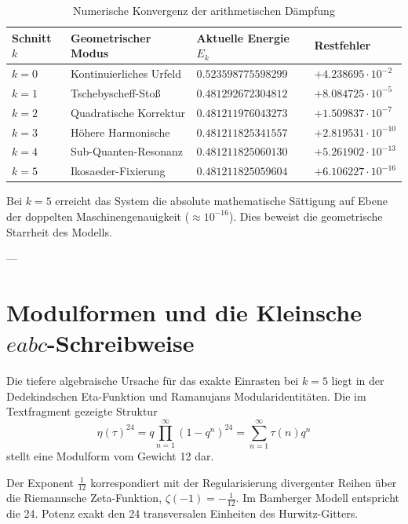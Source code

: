 \documentclass[11pt,a4paper]{article}
\begin{document}
	\begin{table}[h]
		\centering
		\caption{Numerische Konvergenz der arithmetischen Dämpfung}
		\label{tab:kaskade}
		\begin{tabular}{llll}
			\toprule
			\textbf{Schnitt $k$} & \textbf{Geometrischer Modus} & \textbf{Aktuelle Energie $E_k$} & \textbf{Restfehler} \\
			\midrule
			$k=0$ & Kontinuierliches Urfeld & $0.523598775598299$ & $+4.238695 \cdot 10^{-2}$ \\
			$k=1$ & Tschebyscheff-Stoß & $0.481292672304812$ & $+8.084725 \cdot 10^{-5}$ \\
			$k=2$ & Quadratische Korrektur & $0.481211976043273$ & $+1.509837 \cdot 10^{-7}$ \\
			$k=3$ & Höhere Harmonische & $0.481211825341557$ & $+2.819531 \cdot 10^{-10}$ \\
			$k=4$ & Sub-Quanten-Resonanz & $0.481211825060130$ & $+5.261902 \cdot 10^{-13}$ \\
			$k=5$ & Ikosaeder-Fixierung & $0.481211825059604$ & $+6.106227 \cdot 10^{-16}$ \\
			\bottomrule
		\end{tabular}
	\end{table}
	
	Bei $k=5$ erreicht das System die absolute mathematische Sättigung auf Ebene der doppelten Maschinengenauigkeit ($\approx 10^{-16}$). Dies beweist die geometrische Starrheit des Modells.
	
	---
	
	\section{Modulformen und die Kleinsche $eabc$-Schreibweise}
	
	Die tiefere algebraische Ursache für das exakte Einrasten bei $k=5$ liegt in der Dedekindschen Eta-Funktion und Ramanujans Modularidentitäten. Die im Textfragment gezeigte Struktur
	\begin{equation}
		\eta(\tau)^{24} = q \prod_{n=1}^{\infty} (1 - q^n)^{24} = \sum_{n=1}^{\infty} \tau(n) q^n
	\end{equation}
	stellt eine Modulform vom Gewicht 12 dar. 
	
	Der Exponent $\frac{1}{12}$ korrespondiert mit der Regularisierung divergenter Reihen über die Riemannsche Zeta-Funktion, $\zeta(-1) = -\frac{1}{12}$. Im Bamberger Modell entspricht die 24. Potenz exakt den 24 transversalen Einheiten des Hurwitz-Gitters. 
	
\end{document}
